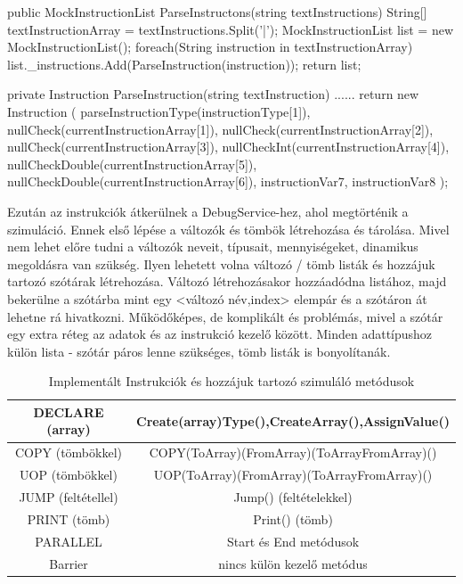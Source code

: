 \begin{cpp}
public MockInstructionList ParseInstructons(string textInstructions)
        {
            String[] textInstructionArray = textInstructions.Split('|');
            MockInstructionList list = new MockInstructionList();
            foreach(String instruction in textInstructionArray)
            {         
                list._instructions.Add(ParseInstruction(instruction));
            }
            return list;
        }
        
private Instruction ParseInstruction(string textInstruction)
        {
            ......
            return  new Instruction
                (
                    parseInstructionType(instructionType[1]),
                    nullCheck(currentInstructionArray[1]),
                    nullCheck(currentInstructionArray[2]),
                    nullCheck(currentInstructionArray[3]), 
                    nullCheckInt(currentInstructionArray[4]),
                    nullCheckDouble(currentInstructionArray[5]),
                    nullCheckDouble(currentInstructionArray[6]),
                    instructionVar7,
                    instructionVar8
                 );
        }
\end{cpp}


Ezután az instrukciók átkerülnek a DebugService-hez, ahol megtörténik a szimuláció.
Ennek első lépése a változók és tömbök létrehozása és tárolása. Mivel nem lehet előre tudni a változók neveit, típusait, mennyiségeket, dinamikus megoldásra van szükség. Ilyen lehetett volna változó / tömb listák és hozzájuk tartozó szótárak létrehozása. Változó létrehozásakor hozzáadódna listához, majd bekerülne a szótárba mint egy <változó név,index> elempár és a szótáron át lehetne rá hivatkozni. Működőképes, de komplikált és problémás, mivel a szótár egy extra réteg az adatok és az instrukció kezelő között. Minden adattípushoz külön lista - szótár páros lenne szükséges, tömb listák is bonyolítanák.

\begin{table}[h]
\centering
\caption{Implementált Instrukciók és hozzájuk tartozó szimuláló metódusok}
\label{tab:barrier}
\begin{tabular}{|c|c|}
\hline
DECLARE (array) & Create(array)Type(),CreateArray(),AssignValue()  \\
\hline
COPY (tömbökkel) & COPY(ToArray)(FromArray)(ToArrayFromArray)() \\
\hline
UOP (tömbökkel) & UOP(ToArray)(FromArray)(ToArrayFromArray)() \\
\hline
JUMP (feltétellel) & Jump() (feltételekkel)\\
\hline 
PRINT (tömb) & Print() (tömb) \\
\hline
PARALLEL & Start és End metódusok \\
\hline
Barrier & nincs külön kezelő metódus \\
\hline
\end{tabular}
\end{table}

